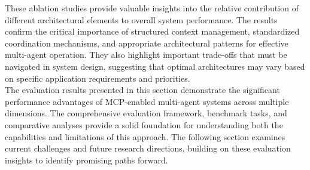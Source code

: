 These ablation studies provide valuable insights into the relative contribution of different architectural elements to overall system performance. The results confirm the critical importance of structured context management, standardized coordination mechanisms, and appropriate architectural patterns for effective multi-agent operation. They also highlight important trade-offs that must be navigated in system design, suggesting that optimal architectures may vary based on specific application requirements and priorities.\\ \newline
The evaluation results presented in this section demonstrate the significant performance advantages of MCP-enabled multi-agent systems across multiple dimensions. The comprehensive evaluation framework, benchmark tasks, and comparative analyses provide a solid foundation for understanding both the capabilities and limitations of this approach. The following section examines current challenges and future research directions, building on these evaluation insights to identify promising paths forward.\\ \newline
